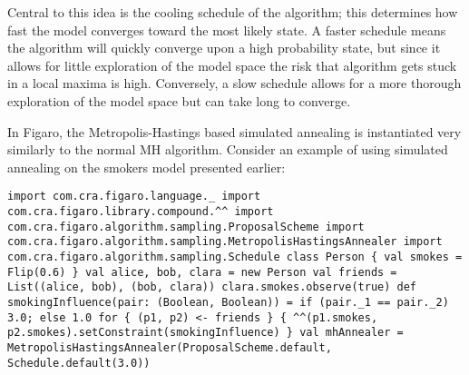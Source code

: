 Central to this idea is the cooling schedule of the algorithm; this determines how fast the model converges toward the most likely state. A faster schedule means the algorithm will quickly converge upon a high probability state, but since it allows for little exploration of the model space the risk that algorithm gets stuck in a local maxima is high. Conversely, a slow schedule allows for a more thorough exploration of the model space but can take long to converge.

In Figaro, the Metropolis-Hastings based simulated annealing is instantiated very similarly to the normal MH algorithm. Consider an example of using simulated annealing on the smokers model presented earlier:

\begin{flushleft}
\texttt{import com.cra.figaro.language.\_
\newline import com.cra.figaro.library.compound.\textasciicircum\textasciicircum
\newline import com.cra.figaro.algorithm.sampling.ProposalScheme
\newline import com.cra.figaro.algorithm.sampling.MetropolisHastingsAnnealer 
\newline import com.cra.figaro.algorithm.sampling.Schedule
\newline 
\newline class Person \{
\newline \tab val smokes = Flip(0.6)
\newline \}
\newline 
\newline val alice, bob, clara = new Person
\newline val friends = List((alice, bob), (bob, clara))
\newline clara.smokes.observe(true)
\newline 
\newline def smokingInfluence(pair: (Boolean, Boolean)) =
\newline \tab if (pair.\_1 == pair.\_2) 3.0; else 1.0
\newline 
\newline for \{ (p1, p2) <- friends \} \{
\newline \tab \textasciicircum\textasciicircum(p1.smokes, p2.smokes).setConstraint(smokingInfluence)
\newline \}
\newline 
\newline val mhAnnealer = MetropolisHastingsAnnealer(ProposalScheme.default, Schedule.default(3.0)) }
\end{flushleft}

